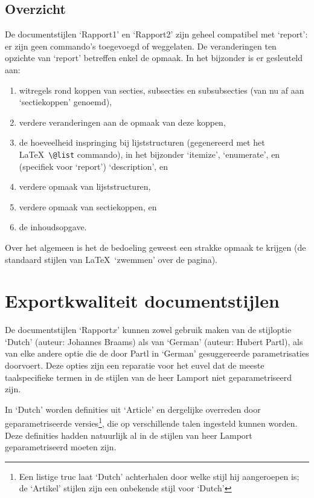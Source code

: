 \documentclass[oldtoc,a4paper,10pt]{rapport3}
\begin{document}
 
\section{Overzicht}
 
De documentstijlen `Rapport1' en `Rapport2' zijn geheel compatibel met
`report': er zijn geen commando's toegevoegd of weggelaten.  De
veranderingen ten opzichte van `report' betreffen enkel de opmaak.  In
het bijzonder is er gesleuteld aan:
\begin{enumerate}
\item witregels rond koppen van secties, subsecties en subsubsecties
  (van nu af aan `sectiekoppen' genoemd),
\item verdere veranderingen aan de opmaak van deze koppen,
\item de hoeveelheid inspringing bij lijststructuren (gegenereerd met
  het \LaTeX\ \verb.\@list. commando), in het bijzonder `itemize',
  `enumerate', en (specifiek voor `report') `description', en
\item verdere opmaak van lijststructuren,
\item verdere opmaak van sectiekoppen, en
\item de inhoudsopgave.
\end{enumerate}
Over het algemeen is het de bedoeling geweest een strakke opmaak te
krijgen (de standaard stijlen van \LaTeX\ `zwemmen' over de pagina).
 
 
 
\chapter{Exportkwaliteit documentstijlen}
 
De documentstijlen `Rapport$x$' kunnen zowel gebruik maken van de
stijloptie `Dutch' (auteur: Johannes Braams) als van `German' (auteur:
Hubert Partl), als van elke andere optie die de door Partl in `German'
gesuggereerde parametrisaties doorvoert.  Deze opties zijn een
reparatie voor het euvel dat de meeste taalspecifieke termen in de
stijlen van de heer Lamport niet geparametriseerd zijn.
 
In `Dutch' worden definities uit `Article' en dergelijke overreden
door geparametriseerde versies\footnote{Een listige truc laat `Dutch'
  achterhalen door welke stijl hij aangeroepen is; de `Artikel'
  stijlen zijn een onbekende stijl voor `Dutch'}, die op verschillende
talen ingesteld kunnen worden.  Deze definities hadden natuurlijk al
in de stijlen van heer Lamport geparametriseerd moeten zijn.
 
\end{document}
